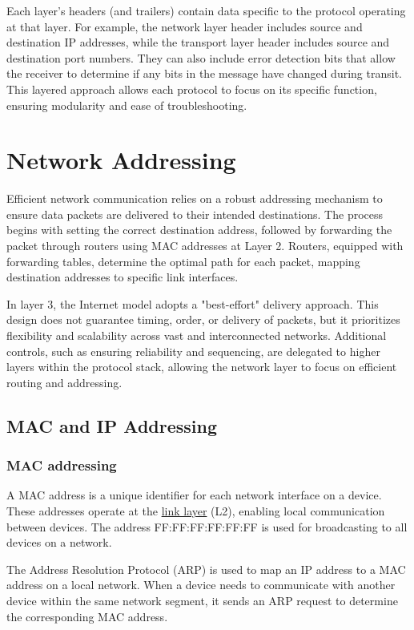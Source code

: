 Each layer's headers (and trailers) contain data specific to the protocol operating at that layer. For example, the network layer header includes source and destination IP addresses, while the transport layer header includes source and destination port numbers. They can also include error detection bits that allow the receiver to determine if any bits in the message have changed during transit. This layered approach allows each protocol to focus on its specific function, ensuring modularity and ease of troubleshooting.

\section{Network Addressing} \label{addressing}

Efficient network communication relies on a robust addressing mechanism to ensure data packets are delivered to their intended destinations. The process begins with setting the correct destination address, followed by forwarding the packet through routers using MAC addresses at Layer 2. Routers, equipped with forwarding tables, determine the optimal path for each packet, mapping destination addresses to specific link interfaces.

In layer 3, the Internet model adopts a "best-effort" delivery approach. This design does not guarantee timing, order, or delivery of packets, but it prioritizes flexibility and scalability across vast and interconnected networks. Additional controls, such as ensuring reliability and sequencing, are delegated to higher layers within the protocol stack, allowing the network layer to focus on efficient routing and addressing.

\subsection{MAC and IP Addressing}

\subsubsection{MAC addressing} \label{mac_addr}

A MAC address is a unique identifier for each network interface on a device. These addresses operate at the \hyperref[layer2]{link layer} (L2), enabling local communication between devices. The address FF:FF:FF:FF:FF:FF is used for broadcasting to all devices on a network.

The Address Resolution Protocol (ARP) is used to map an IP address to a MAC address on a local network. When a device needs to communicate with another device within the same network segment, it sends an ARP request to determine the corresponding MAC address.

